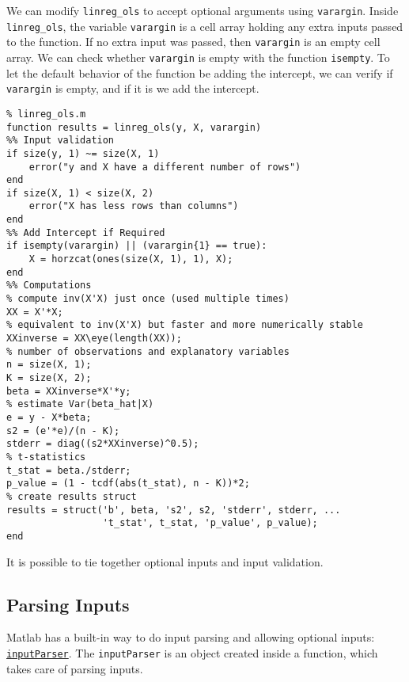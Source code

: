 \documentclass[12pt, a4paper]{article}
\begin{document}
We can modify \texttt{linreg\_ols} to accept optional arguments using \texttt{varargin}.
Inside \texttt{linreg\_ols}, the variable \texttt{varargin} is a cell array holding any extra inputs passed to the function. If no extra input was passed, then \texttt{varargin} is an empty cell array. We can check whether \texttt{varargin} is empty with the function \texttt{isempty}.
To let the default behavior of the function be adding the intercept, we can verify if \texttt{varargin} is empty, and if it is we add the intercept.
\lstset{language=matlab,label= ,caption= ,captionpos=b,firstnumber=1,numbers=left,style=Matlab-editor}
\begin{lstlisting}
% linreg_ols.m
function results = linreg_ols(y, X, varargin)
%% Input validation
if size(y, 1) ~= size(X, 1)
    error("y and X have a different number of rows")
end
if size(X, 1) < size(X, 2)
    error("X has less rows than columns")
end
%% Add Intercept if Required
if isempty(varargin) || (varargin{1} == true):
    X = horzcat(ones(size(X, 1), 1), X);
end
%% Computations
% compute inv(X'X) just once (used multiple times)
XX = X'*X;
% equivalent to inv(X'X) but faster and more numerically stable
XXinverse = XX\eye(length(XX));
% number of observations and explanatory variables
n = size(X, 1);
K = size(X, 2);
beta = XXinverse*X'*y;
% estimate Var(beta_hat|X)
e = y - X*beta;
s2 = (e'*e)/(n - K);
stderr = diag((s2*XXinverse)^0.5);
% t-statistics
t_stat = beta./stderr;
p_value = (1 - tcdf(abs(t_stat), n - K))*2;
% create results struct
results = struct('b', beta, 's2', s2, 'stderr', stderr, ...
                 't_stat', t_stat, 'p_value', p_value);
end
\end{lstlisting}
It is possible to tie together optional inputs and input validation.
\subsection{Parsing Inputs}
\label{sec:orgff72df4}
Matlab has a built-in way to do input parsing and allowing optional inputs: \href{https://www.mathworks.com/help/matlab/ref/inputparser.html}{\texttt{inputParser}}.
The \texttt{inputParser} is an object created inside a function, which takes care of parsing inputs.
\end{document}
